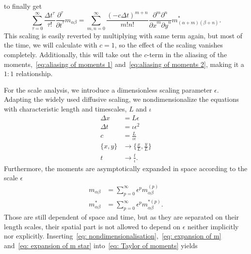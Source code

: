 to finally get
\begin{equation}
  \sum_{\tau = 0}^\infty \frac{{\Delta t}^\tau }{\tau!} \frac{\partial^\tau}{{\partial t}^\tau} m_{\alpha\beta} =
 \sum_{m,n = 0}^\infty \frac{{(- c\Delta t)}^{m+n}} {m!n!} \frac{\partial^m \partial^n}{ {\partial x}^m{\partial y}^n} m^*_{(\alpha + m)(\beta + n)}.
\end{equation}
This scaling is easily reverted by multiplying with same term again, but most of the time, we will calculate with $c=1$, so the effect of the scaling vanishes completely.
Additionally, this will take out the $c$-term in the aliasing of the moments,~\eqref{eq:aliasing of moments 1} and~\eqref{eq:aliasing of moments 2}, making it a $1:1$ relationship.

For the scale analysis, we introduce a dimensionless scaling parameter $\epsilon$.
Adapting the widely used diffusive scaling, we nondimensionalize the equations with characteristic length and timescales, $L$ and $\iota$
\begin{equation}
  \label{eq: nondimensionalisation}
  \begin{aligned}
    \Delta x & = L\epsilon \\
    \Delta t & = \iota\epsilon^2 \\
    c & = \frac{L}{\iota\epsilon} \\
    \{x, y\} & \rightarrow \{\frac{x}{L}, \frac{y}{L}\} \\
    t & \rightarrow \frac{t}{\iota}.
  \end{aligned}
\end{equation}
Furthermore, the moments are asymptotically expanded in space according to the scale $\epsilon$
\begin{align}
    \label{eq: expansion of m}
    m_{\alpha\beta} & = \sum_{p=0}^{\infty} \epsilon^p m_{\alpha\beta}^{(p)} \\
    \label{eq: expansion of m star}
    m^*_{\alpha\beta} & = \sum_{p=0}^{\infty} \epsilon^p m_{\alpha\beta}^{*(p)}.
\end{align}
Those are still dependent of space and time, but as they are separated on their length scales, their spatial part is not allowed to depend on $\epsilon$ neither implicitly nor explicitly.
Inserting~\eqref{eq: nondimensionalisation},~\eqref{eq: expansion of m} and~\eqref{eq: expansion of m star} into~\eqref{eq: Taylor of moments} yields

